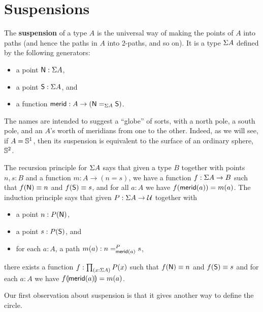 \section{Suspensions}
\label{sec:suspension}

The \textbf{suspension} of a type $A$ is the universal way of making the points of $A$ into paths (and hence the paths in $A$ into 2-paths, and so on).
It is a type $\susp A$ defined by the following generators:
\begin{itemize}
\item a point $\north:\susp A$,
\item a point $\south:\susp A$, and
\item a function $\merid:A \to (\id[\susp A]\north\south)$.
\end{itemize}
The names are intended to suggest a ``globe'' of sorts, with a north pole, a south pole, and an $A$'s worth of meridians from one to the other.
Indeed, as we will see, if $A=\Sn^1$, then its suspension is equivalent to the surface of an ordinary sphere, $\Sn^2$.

The recursion principle for $\susp A$ says that given a type $B$ together with points $n,s:B$ and a function $m:A \to (n=s)$, we have a function $f:\susp A \to B$ such that $f(\north)\jdeq n$ and $f(\south)\jdeq s$, and for all $a:A$ we have $\ap f {\merid(a)} = m(a)$.
The induction principle says that given $P:\susp A \to \type$ together with
\begin{itemize}
\item a point $n:P(\north)$,
\item a point $s:P(\south)$, and
\item for each $a:A$, a path $m(a):\dpath P{\merid(a)}ns$,
\end{itemize}
there exists a function $f:\prd{x:\susp A} P(x)$ such that $f(\north)\jdeq n$ and $f(\south)\jdeq s$ and for each $a:A$ we have $\apd f {\merid(a)} = m(a)$.

Our first observation about suspension is that it gives another way to define the circle.

